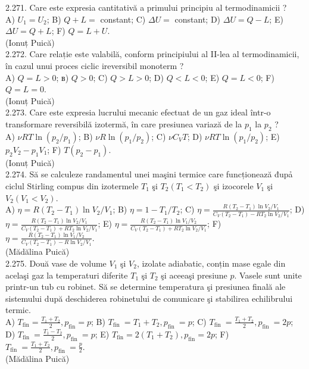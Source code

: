 \documentclass[10pt]{article}
\begin{document}
2.271. Care este expresia cantitativă a primului principiu al termodinamicii ?\\ A) $U_{1}=U_{2}$; B) $Q+L=$ constant; C) $\Delta U=$ constant; D) $\Delta U=Q-L$; E) $\Delta U=Q+L$; F) $Q=L+U$.\\ (Ionuț Puică)\\

2.272. Care relație este valabilă, conform principiului al II-lea al termodinamicii, în cazul unui proces ciclic ireversibil monoterm ?\\ A) $Q=L>0$; в) $Q>0$; C) $Q>L>0$; D) $Q<L<0$; E) $Q=L<0$; F) $Q=L=0$.\\ (Ionuț Puică)\\

2.273. Care este expresia lucrului mecanic efectuat de un gaz ideal într-o transformare reversibilă izotermă, în care presiunea variază de la $p_{1}$ la $p_{2}$ ?\\ A) $\nu R T \ln \left(p_{2} / p_{1}\right)$; B) $\nu R \ln \left(p_{1} / p_{2}\right)$; C) $\nu C_{V} T$; D) $\nu R T \ln \left(p_{1} / p_{2}\right)$; E) $p_{2} V_{2}-p_{1} V_{1}$; F) $T\left(p_{2}-p_{1}\right)$.\\ (Ionuț Puică)\\

2.274. Să se calculeze randamentul unei maşini termice care funcționează đupả ciclul Stirling compus din izotermele $T_{1}$ şi $T_{2}\left(T_{1}<T_{2}\right)$ şi izocorele $V_{1}$ şi $V_{2}\left(V_{1}<V_{2}\right)$.\\ A) $\eta=R\left(T_{2}-T_{1}\right) \ln V_{2} / V_{1}$; B) $\eta=1-T_{1} / T_{2}$; C) $\eta=\frac{R\left(T_{2}-T_{1}\right) \ln V_{2} / V_{1}}{C_{V}\left(T_{2}-T_{1}\right)-R T_{2} \ln V_{2} / V_{1}}$; D) $\eta=\frac{R\left(T_{2}-T_{1}\right) \ln V_{2} / V_{1}}{C_{V}\left(T_{2}-T_{1}\right)+R T_{2} \ln V_{2} / V_{1}}$; E) $\eta=\frac{R\left(T_{2}-T_{1}\right) \ln V_{1} / V_{2}}{C_{V}\left(T_{2}-T_{1}\right)+R T_{2} \ln V_{2} / V_{1}}$; F) $\eta=\frac{R\left(T_{2}-T_{1}\right) \ln V_{1} / V_{2}}{C_{V}\left(T_{2}-T_{1}\right)-R \ln V_{2} / V_{1}}$.\\ (Mădălina Puică)\\

2.275. Două vase de volume $V_{1}$ şi $V_{2}$, izolate adiabatic, conțin mase egale din acelaşi gaz la temperaturi diferite $T_{1}$ şi $T_{2}$ şi aceeaşi presiune $p$. Vasele sunt unite printr-un tub cu robinet. Să se determine temperatura şi presiunea finală ale sistemului după deschiderea robinetului de comunicare şi stabilirea echilibrului termic.\\ A) $T_{\mathrm{fin}}=\frac{T_{1}+T_{2}}{2}, p_{\mathrm{fin}}=p$; B) $T_{\text {fin }}=T_{1}+T_{2}, p_{\text {fin }}=p$; C) $T_{\text {fin }}=\frac{T_{1}+T_{2}}{2}, p_{\text {fin }}=2 p$; D) $T_{\text {fin }}=\frac{T_{1}-T_{2}}{2}, p_{\text {fin }}=p$; E) $T_{\mathrm{fin}}=2\left(T_{1}+T_{2}\right), p_{\mathrm{fin}}=2 p$; F) $T_{\text {fin }}=\frac{T_{1}+T_{2}}{2}, p_{\text {fin }}=\frac{p}{2}$.\\ (Mădălina Puică)\\
\end{document}
